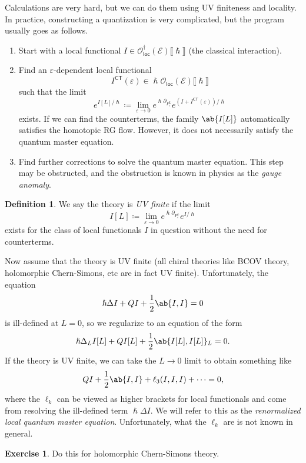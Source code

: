 \documentclass{amsart}
\theoremstyle{definition}
\newtheorem{defn}[thm]{Definition}
\newtheorem{exer}[thm]{Exercise}
\theoremstyle{remark}
\theoremstyle{plain}
\theoremstyle{definition}
\theoremstyle{remark}
\newcommand{\ep}{\varepsilon}
\newcommand{\mc}[1]{\mathcal{#1}}
\newcommand{\ms}[1]{\mathsf{#1}}
\newcommand{\1}{\mathbf{1}}
\newcommand{\2}{\mathbf{2}}
\newcommand{\3}{\mathbf{3}}
\newcommand{\ps}[1]{\lBrack #1 \rBrack}
\begin{document}
Calculations are very hard, but we can do them using UV finiteness and locality. In practice, constructing a quantization is very complicated, but the program usually goes as follows.
\begin{enumerate}
    \item Start with a local functional \(I \in \mc{O}_{\ms{loc}}^{\dagger}(\mc{E})\ps{\hslash}\) (the classical interaction).
    \item Find an \(\ep\)-dependent local functional
    \[ I^{\ms{CT}}(\ep) \in \hslash \mc{O}_{\ms{loc}}(\mc{E})\ps{\hslash} \]
    such that the limit
    \[ e^{I[L]/\hslash} \coloneqq \lim_{\ep \to 0} e^{\hslash \partial_{P_{\ep}^L}} e^{(I + I^{\ms{CT}}(\ep))/\hslash} \]
    exists. If we can find the counterterms, the family \(\ab\{I[L]\}\) automatically satisfies the homotopic RG flow. However, it does not necessarily satisfy the quantum master equation.
    \item Find further corrections to solve the quantum master equation. This step may be obstructed, and the obstruction is known in physics as the \textit{gauge anomaly}.
\end{enumerate}

\begin{defn}
    We say the theory is \textit{UV finite} if the limit
    \[ I[L] \coloneqq \lim_{\ep \to 0} e^{\hslash \partial_{P_{\ep}^L}} e^{I/\hslash} \]
    exists for the class of local functionals \(I\) in question without the need for counterterms.
\end{defn}

Now assume that the theory is UV finite (all chiral theories like BCOV theory, holomorphic Chern-Simons, etc are in fact UV finite). Unfortunately, the equation
\[ \hslash \Delta I + Q I + \frac{1}{2} \ab\{ I, I \} = 0 \]
is ill-defined at \(L = 0\), so we regularize to an equation of the form
\[ \hslash \Delta_L I[L] + Q I[L] + \frac{1}{2} \ab\{ I[L], I[L] \}_L = 0. \]
If the theory is UV finite, we can take the \(L \to 0\) limit to obtain something like
\[ Q I + \frac{1}{2} \ab\{ I, I\} + \ell_3(I,I,I) + \cdots = 0, \]
where the \(\ell_k\) can be viewed as higher brackets for local functionals and come from resolving the ill-defined term \(\hslash \Delta I\). We will refer to this as the \textit{renormalized local quantum master equation}. Unfortunately, what the \(\ell_k\) are is not known in general.

\begin{exer}
    Do this for holomorphic Chern-Simons theory.
\end{exer}
\end{document}
